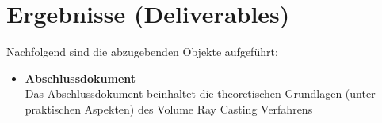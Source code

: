 \section{Ergebnisse (Deliverables)}
\label{sec:deliverables}

Nachfolgend sind die abzugebenden Objekte aufgeführt:
\begin{itemize}
    \item \textbf{Abschlussdokument} \\
        Das Abschlussdokument beinhaltet die theoretischen Grundlagen (unter praktischen Aspekten) des Volume Ray Casting Verfahrens
\end{itemize}
